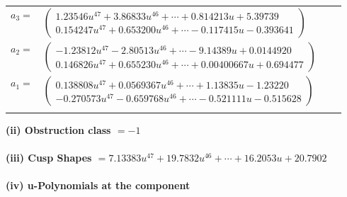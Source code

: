 \documentclass[1p]{elsarticle_modified}
\theoremstyle{definition}
\begin{document}
\begin{tabular}{m{7pt} m{180pt} m{7pt} m{180pt} }
\flushright $a_{3}=$&$\begin{pmatrix}1.23546 u^{47}+3.86833 u^{46}+\cdots+0.814213 u+5.39739\\0.154247 u^{47}+0.653200 u^{46}+\cdots-0.117415 u-0.393641\end{pmatrix}$ \\
\flushright $a_{2}=$&$\begin{pmatrix}-1.23812 u^{47}-2.80513 u^{46}+\cdots-9.14389 u+0.0144920\\0.146826 u^{47}+0.655230 u^{46}+\cdots+0.00400667 u+0.694477\end{pmatrix}$ \\
\flushright $a_{1}=$&$\begin{pmatrix}0.138808 u^{47}+0.0569367 u^{46}+\cdots+1.13835 u-1.23220\\-0.270573 u^{47}-0.659768 u^{46}+\cdots-0.521111 u-0.515628\end{pmatrix}$\\&\end{tabular}
\flushleft \textbf{(ii) Obstruction class $= -1$}\\~\\
\flushleft \textbf{(iii) Cusp Shapes $= 7.13383 u^{47}+19.7832 u^{46}+\cdots+16.2053 u+20.7902$}\\~\\
\newpage\renewcommand{\arraystretch}{1}
\flushleft \textbf{(iv) u-Polynomials at the component}\newline \\
\end{document}
